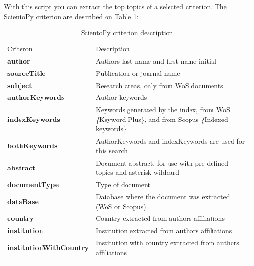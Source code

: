 \documentclass[10pt,letterpaper]{article}
\begin{document}
With this script you can extract the top topics of a selected criterion. The ScientoPy criterion are described on Table \ref{table_criterion}:

\begin{table}[h]
	\centering
	\caption{ScientoPy criterion description}
	\label{table_criterion}
	
	\renewcommand{\arraystretch}{1.5}
	\begin{tabular}{p{3.5cm} p{10cm}}
	\hline\noalign{\smallskip}
	Criteron       & Description                             \\
	\noalign{\smallskip}\hline\noalign{\smallskip}                                                                         
	\textbf{author}         & Authors last name and first name initial                                                                       \\
	\textbf{sourceTitle}    & Publication or journal name                                                                                    \\
	\textbf{subject}        & Research areas, only from WoS documents                                                                        \\
	\textbf{authorKeywords} & Author keywords                                                                                                \\
	\textbf{indexKeywords}  & Keywords generated by the index, from WoS \textit\{Keyword Plus\}, and from Scopus \textit\{Indexed keywords\} \\
	\textbf{bothKeywords}   & AuthorKeywords and indexKeywords are used for this search                                                      \\
	\textbf{abstract}       & Document abstract, for use with pre-defined topics and asterisk wildcard\\
	\textbf{documentType}   & Type of document                                                                                               \\
	\textbf{dataBase}       & Database where the document was extracted (WoS or Scopus)                                                      \\
	\textbf{country}        & Country extracted from authors affiliations                                                                    \\
	\textbf{institution}    & Institution extracted from authors affiliations                                                                \\
	\textbf{institutionWithCountry}    & Institution with country extracted from authors affiliations                                        \\
	\noalign{\smallskip}\hline
	\end{tabular}
	
\end{table}
\end{document}
